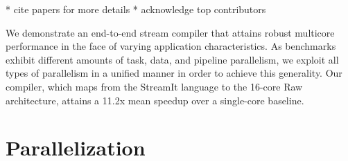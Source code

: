 
\label{chap:optimizing}

* cite papers for more details
* acknowledge top contributors

We demonstrate an end-to-end stream compiler that attains robust
multicore performance in the face of varying application
characteristics.  As benchmarks exhibit different amounts of task,
data, and pipeline parallelism, we exploit all types of parallelism in
a unified manner in order to achieve this generality.  Our compiler,
which maps from the StreamIt language to the 16-core Raw architecture,
attains a 11.2x mean speedup over a single-core baseline.

\section{Parallelization}




